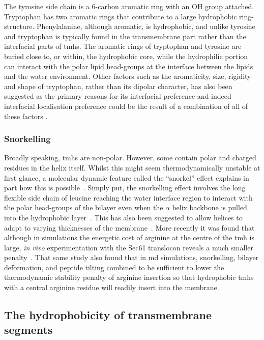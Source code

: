 The tyrosine side chain is a 6\--carbon aromatic ring with an OH group attached.
Tryptophan has two aromatic rings that contribute to a large hydrophobic ring-structure.
Phenylalanine, although aromatic, is hydrophobic, and unlike tyrosine and tryptophan is typically found in the transmembrane part rather than the interfacial parts of \gls{tmh}s.
The aromatic rings of tryptophan and tyrosine are buried close to, or within, the hydrophobic core, while the hydrophilic portion can interact with the polar lipid head\--groups at the interface between the lipids and the water environment.
Other factors such as the aromaticity, size, rigidity and shape of tryptophan, rather than its dipolar character, has also been suggested as the primary reasons for its interfacial preference and indeed interfacial localisation preference could be the result of a combination of all of these factors \cite{Yau1998}.


\subsubsection{Snorkelling}

Broadly speaking, \gls{tmh}s are non-polar.
However, some contain polar and charged residues in the helix itself.
Whilst this might seem thermodynamically unstable at first glance, a molecular dynamic feature called the ``snorkel'' effect explains in part how this is possible~\cite{Chamberlain2004, Strandberg2003}.
Simply put, the snorkelling effect involves the long flexible side chain of leucine reaching the water interface region to interact with the polar head-groups of the bilayer even when the $\alpha$ helix backbone is pulled into the hydrophobic layer~\cite{Krishnakumar2007}.
This has also been suggested to allow helices to adapt to varying thicknesses of the membrane~\cite{Kandasamy2006}.
More recently it was found that although in simulations the energetic cost of arginine at the centre of the \gls{tmh} is large, \textit{in vivo} experimentation with the Sec61 translocon reveals a much smaller penalty~\cite{Ulmschneider2017}.
That same study also found that in \gls{md} simulations, snorkelling, bilayer deformation, and peptide tilting combined to be sufficient to lower the thermodynamic stability penalty of arginine insertion so that hydrophobic \gls{tmh}s with a central arginine residue will readily insert into the membrane.


\subsection{The hydrophobicity of transmembrane segments}\label{section:hydrophobicityscales}

